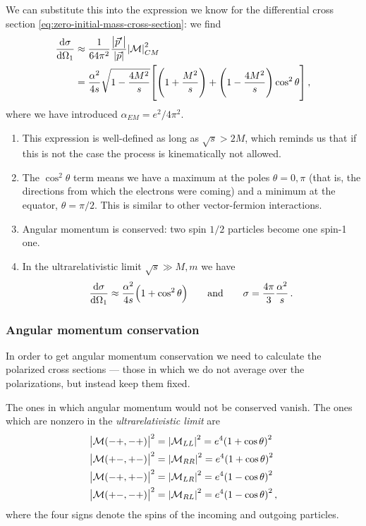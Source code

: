 \documentclass[main.tex]{subfiles}
\begin{document}
We can substitute this into the expression we know for the differential cross section \eqref{eq:zero-initial-mass-cross-section}: we find 
%
\begin{align}
\dv{\sigma }{\Omega_1 }
&\approx
\frac{1}{64 \pi^2}
\frac{\abs{\vec{p}'}}{\abs{\vec{p}}}
\abs{\mathcal{M}}^2_{CM}  \\
&= \frac{\alpha^2}{4 s} \sqrt{1 - \frac{4M^2}{s}}
\qty[ \qty(1 + \frac{M^2}{s}) +   \qty(1 - \frac{4M^2}{s}) \cos^2\theta ]
\,,
\end{align}
%
where we have introduced \(\alpha_{EM} = e^2 / 4 \pi^2\). 

\begin{enumerate}
    \item This expression is well-defined as long as \(\sqrt{s} > 2M\), which reminds us that if this is not the case the process is kinematically not allowed. 
    \item The \(\cos^2\theta \) term means we have a maximum at the poles \(\theta = 0, \pi \) (that is, the directions from which the electrons were coming) and a minimum at the equator, \(\theta = \pi /2\). This is similar to other vector-fermion interactions. 
    \item Angular momentum is conserved: two spin \(1/2\) particles become one spin-1 one. 
    \item In the ultrarelativistic limit \(\sqrt{s} \gg M, m\) we have 
    \begin{align}
    \dv{\sigma }{\Omega_1 } \approx \frac{\alpha^2}{4 s} \qty(1 + \cos^2 \theta )
    \qquad \text{and} \qquad
    \sigma = \frac{4 \pi }{3} \frac{\alpha^2}{s} 
    \,.
    \end{align}
\end{enumerate}

\subsubsection{Angular momentum conservation}

In order to get angular momentum conservation we need to calculate the polarized cross sections --- those in which we do not average over the polarizations, but instead keep them fixed.

The ones in which angular momentum would not be conserved vanish. The ones which are nonzero in the \emph{ultrarelativistic limit} are
%
\begin{align}
\abs{\mathcal{M}(-+, - + )}^2 &= \abs{\mathcal{M}_{LL}}^2 = 
e^{4} \qty(1 + \cos \theta )^2 \\
\abs{\mathcal{M}(+ -, + -)}^2 &= \abs{\mathcal{M}_{RR}}^2 = 
e^{4} \qty(1 + \cos \theta )^2 \\
\abs{\mathcal{M}(-+, + -)}^2 &= \abs{\mathcal{M}_{LR}}^2 = 
e^{4} \qty(1 - \cos \theta )^2 \\
\abs{\mathcal{M}(+ -, - + )}^2 &= \abs{\mathcal{M}_{RL}}^2 = 
e^{4} \qty(1 - \cos \theta )^2 
\,,
\end{align}
%
where the four signs denote the spins of the incoming and outgoing particles.
\end{document}

